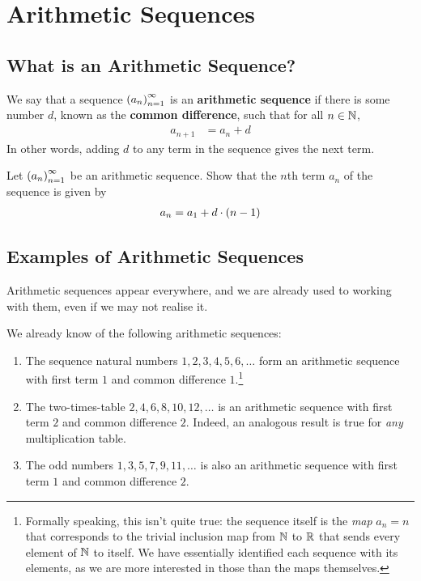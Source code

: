 \section{Arithmetic Sequences}

\subsection{What is an Arithmetic Sequence?}

\begin{definition}
    We say that a sequence $\left( a_n \right)_{n=1}^{\infty}$ is an \textbf{arithmetic sequence} if there is some number $d$, known as the \textbf{common difference}, such that for all $n \in \mathbb{N}$,
    \begin{align}
        a_{n+1} &= a_n + d
    \end{align}
    In other words, adding $d$ to any term in the sequence gives the next term.
\end{definition}

\begin{boxexercise}
Let $\left( a_n \right)_{n=1}^{\infty}$ be an arithmetic sequence. Show that the $n$th term $a_n$ of the sequence is given by
\begin{align}
    a_n = a_1 + d \cdot \left( n - 1 \right) \label{eq:AS_nth_term}
\end{align}
\end{boxexercise}

\subsection{Examples of Arithmetic Sequences}

Arithmetic sequences appear everywhere, and we are already used to working with them, even if we may not realise it.

\begin{example}
We already know of the following arithmetic sequences:
\begin{enumerate}[noitemsep]
    \item The sequence natural numbers $1,2,3,4,5,6,\ldots$ form an arithmetic sequence with first term $1$ and common difference $1$.\footnote{Formally speaking, this isn't quite true: the sequence itself is the \textit{map} $a_n = n$ that corresponds to the trivial inclusion map from $\mathbb{N}$ to $\mathbb{R}$ that sends every element of $\mathbb{N}$ to itself. We have essentially identified each sequence with its elements, as we are more interested in those than the maps themselves.}
    \item The two-times-table $2, 4, 6, 8, 10, 12, \ldots$ is an arithmetic sequence with first term $2$ and common difference $2$. Indeed, an analogous result is true for \textit{any} multiplication table.
    \item The odd numbers $1, 3, 5, 7, 9, 11, \ldots$ is also an arithmetic sequence with first term $1$ and common difference $2$.
\end{enumerate}
\end{example}

